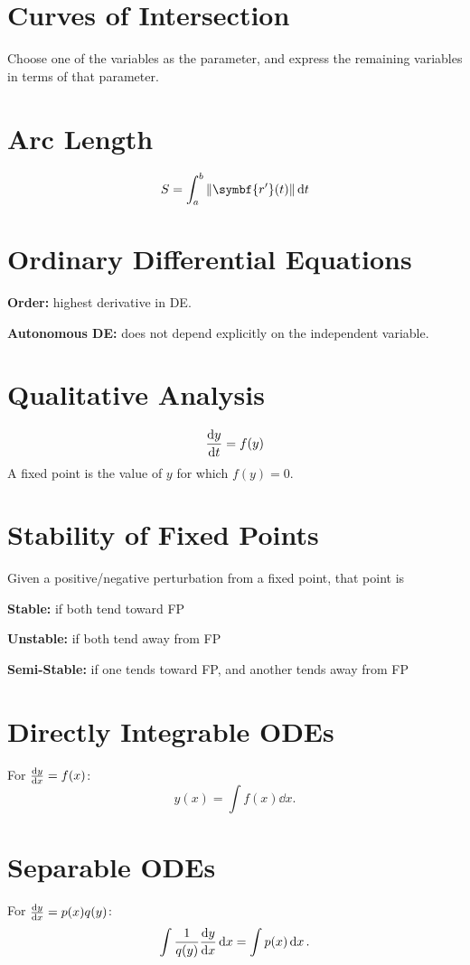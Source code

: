 \documentclass{article}
\begin{document}
\begin{multicols}{3}
    \section*{Curves of Intersection}
    Choose one of the variables as the parameter, and express the remaining variables in terms of that parameter.
    \section*{Arc Length}
    \begin{equation*}
        S = \int_a^b \norm{\symbf{r'}(t)} \dd{t}
    \end{equation*}
    \section*{Ordinary Differential Equations}
    \textbf{Order:} highest derivative in DE\@.

    \textbf{Autonomous DE:} does not depend explicitly on the independent variable.
    \section*{Qualitative Analysis}
    \begin{equation*}
        \dv{y}{t} = f(y)
    \end{equation*}
    A fixed point is the value of \(y\) for which \(f(y) = 0\).
    \section*{Stability of Fixed Points}
    Given a positive/negative perturbation from a fixed point, that point is

    \textbf{Stable:} if both tend toward FP

    \textbf{Unstable:} if both tend away from FP

    \textbf{Semi-Stable:} if one tends toward FP, and another tends away from FP
    \section*{Directly Integrable ODEs}
    For \(\dv{y}{x} = f(x)\):
    \begin{equation*}
        y(x) = \int f(x) \dd{x}.
    \end{equation*}
    \section*{Separable ODEs}
    For \(\dv{y}{x} = p(x) q(y)\):
    \begin{equation*}
        \int \frac{1}{q(y)} \dv{y}{x} \dd{x} = \int p(x) \dd{x}.
    \end{equation*}

\end{multicols}
\end{document}
